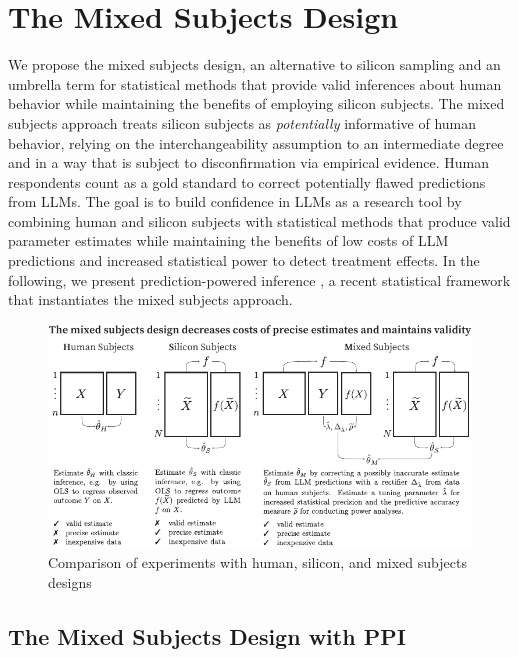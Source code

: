 \documentclass{article}
\begin{document}
\section{The Mixed Subjects Design}

We propose the mixed subjects design, an alternative to silicon sampling and an umbrella term for statistical methods that provide valid inferences about human behavior while maintaining the benefits of employing silicon subjects. The mixed subjects approach treats silicon subjects as \textit{potentially} informative of human behavior, relying on the interchangeability assumption to an intermediate degree and in a way that is subject to disconfirmation via empirical evidence. Human respondents count as a gold standard to correct potentially flawed predictions from LLMs. The goal is to build confidence in LLMs as a research tool by combining human and silicon subjects with statistical methods that produce valid parameter estimates while maintaining the benefits of low costs of LLM predictions and increased statistical power to detect treatment effects. 
In the following, we present prediction-powered inference \citep{angelopoulos_prediction-powered_2023-1}, a recent statistical framework that instantiates the mixed subjects approach.
\clearpage

\begin{figure}[p]
    \centering
    \includegraphics[width=1\linewidth]{0_Infogram_v4.pdf}
    \caption{Comparison of experiments with human, silicon, and mixed subjects designs}
    \label{fig:concept}
\end{figure}

\clearpage

\subsection{The Mixed Subjects Design with PPI}\label{sec:PPI}
\end{document}
